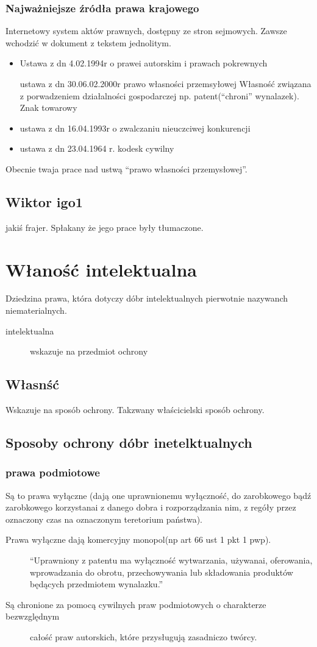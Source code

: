 \documentclass[11pt]{article}
\begin{document}
\subsubsection{Najważniejsze źródła prawa krajowego}
\label{sec:org941b984}
Internetowy system aktów prawnych, dostępny ze stron sejmowych. Zawsze wchodzić w dokument z tekstem jednolitym.
\begin{itemize}
\item Ustawa z dn 4.02.1994r o prawei autorskim i prawach pokrewnych
\item[{ustawa z dn 30.06.02.2000r prawo własności przemsyłowej}] Własność związana z porwadzeniem działalności gospodarczej np. patent(``chroni'' wynalazek). Znak towarowy
\item ustawa z dn 16.04.1993r o zwalczaniu nieuczciwej konkurencji
\item ustawa z dn 23.04.1964 r. kodesk cywilny
\end{itemize}
Obecnie twaja prace nad ustwą ``prawo własności przemysłowej''.
\subsection{Wiktor igo1}
\label{sec:orgb4f1ac1}
jakiś frajer. Spłakany że jego prace były tłumaczone.
\section{Właność intelektualna}
\label{sec:orgac54e63}
Dziedzina prawa, która dotyczy dóbr intelektualnych pierwotnie nazywanch niematerialnych.
\begin{description}
\item[{intelektualna}] wskazuje na przedmiot ochrony
\end{description}
\subsection{Własnść}
\label{sec:org59a966a}
Wskazuje na sposób ochrony.
Takzwany właścicielski sposób ochrony.
\subsection{Sposoby ochrony dóbr inetelktualnych}
\label{sec:orgc8ea6d8}
\subsubsection{prawa podmiotowe}
\label{sec:org1ebc678}
Są to prawa wyłączne (dają one uprawnionemu wyłączność, do zarobkowego bądź zarobkowego korzystanai z danego dobra i rozporządzania nim, z regóły przez oznaczony czas na oznaczonym teretorium państwa).
\begin{description}
\item[{Prawa wyłączne dają komercyjny monopol(np art 66 ust 1 pkt 1 pwp).}] ``Uprawniony z patentu ma wyłączność wytwarzania, używanai, oferowania, wprowadzania do obrotu, przechowywania lub składowania produktów będących przedmiotem wynalazku.''
\item[{Są chronione za pomocą cywilnych praw podmiotowych o charakterze bezwzględnym}] całość praw autorskich, które przysługują zasadniczo twórcy.
\end{description}
\end{document}
